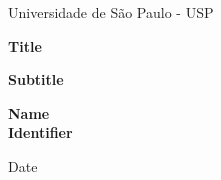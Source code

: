 \documentclass[a4paper,brazil,12pt,titlepage]{article}
\begin{document}

\begin{titlepage}

    \clearpage\thispagestyle{empty}
    \centering
    \vspace{2cm}
    
    {\large Universidade de São Paulo - USP \\
    \par}
    \vspace{4cm}
    {\Huge \textbf{Title}}\\
    \vspace{1cm}
    {\large \textbf{Subtitle} \par}
    \vspace{3cm}
    {\large \textbf{Name} \\
            \textbf{Identifier} \par}
            
    \vspace{10cm}
    {\normalsize Date \par}
    \vspace{2cm}
    
    \pagebreak
    
\end{titlepage}

\tableofcontents{}

\clearpage





\pagestyle{fancy}
\fancyhf{} %
\fancyfoot[C]{\thepage}
\renewcommand{\headrulewidth}{0pt} %
\renewcommand{\headrulewidth}{0pt} %
\renewcommand{\headrulewidth}{1pt}


% 
% 
% 

% 
% 
\end{document}
